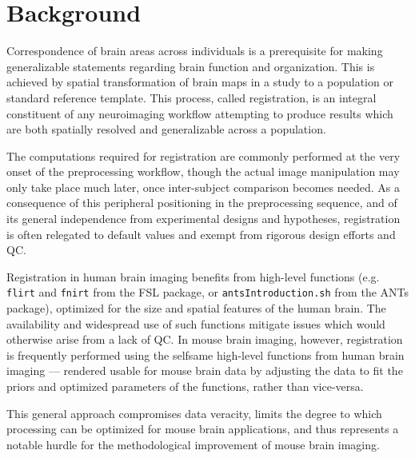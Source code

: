 \section{Background}
\label{sec:bg}

Correspondence of brain areas across individuals is a prerequisite for making generalizable statements regarding brain function and organization.
This is achieved by spatial transformation of brain maps in a study to a population or standard reference template.
This process, called registration, is an integral constituent of any neuroimaging workflow attempting to produce results which are both spatially resolved and generalizable across a population.

The computations required for registration are commonly performed at the very onset of the preprocessing workflow,
though the actual image manipulation may only take place much later, once inter-subject comparison becomes needed.
As a consequence of this peripheral positioning in the preprocessing sequence, and of its general independence from experimental designs and hypotheses, registration is often relegated to default values and exempt from rigorous design efforts and QC.

Registration in human brain imaging benefits from high-level functions (e.g. \textcolor{mg}{\texttt{flirt}} and  \textcolor{mg}{\texttt{fnirt}} from the FSL package\cite{fsl}, or \textcolor{mg}{\texttt{antsIntroduction.sh}} from the ANTs package\cite{ants}), optimized for the size and spatial features of the human brain.
The availability and widespread use of such functions mitigate issues which would otherwise arise from a lack of QC.
In mouse brain imaging, however, registration is frequently performed using the selfsame high-level functions from human brain imaging --- rendered usable for mouse brain data by adjusting the data to fit the priors and optimized parameters of the functions, rather than vice-versa.

This general approach compromises data veracity, limits the degree to which processing can be optimized for mouse brain applications, and thus represents a notable hurdle for the methodological improvement of mouse brain imaging.

